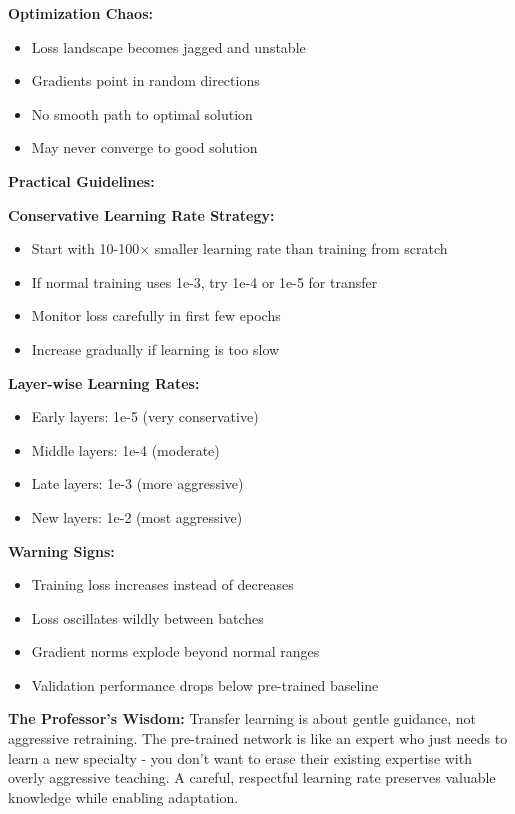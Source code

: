 \documentclass[12pt]{article}
\newcommand{\explanation}[1]{{\color{explanationcolor}#1}}
\begin{document}
\begin{enumerate}[(a)]
{{    \textbf{Optimization Chaos:}
    \begin{itemize}
        \item Loss landscape becomes jagged and unstable
        \item Gradients point in random directions
        \item No smooth path to optimal solution
        \item May never converge to good solution
    \end{itemize}
    }
    
    \textbf{Practical Guidelines:}
    
    \explanation{
    \textbf{Conservative Learning Rate Strategy:}
    \begin{itemize}
        \item Start with 10-100× smaller learning rate than training from scratch
        \item If normal training uses 1e-3, try 1e-4 or 1e-5 for transfer
        \item Monitor loss carefully in first few epochs
        \item Increase gradually if learning is too slow
    \end{itemize}
    
    \textbf{Layer-wise Learning Rates:}
    \begin{itemize}
        \item Early layers: 1e-5 (very conservative)
        \item Middle layers: 1e-4 (moderate)
        \item Late layers: 1e-3 (more aggressive)
        \item New layers: 1e-2 (most aggressive)
    \end{itemize}
    
    \textbf{Warning Signs:}
    \begin{itemize}
        \item Training loss increases instead of decreases
        \item Loss oscillates wildly between batches
        \item Gradient norms explode beyond normal ranges
        \item Validation performance drops below pre-trained baseline
    \end{itemize}
    }
    
    \textbf{The Professor's Wisdom:}
    \explanation{
    Transfer learning is about gentle guidance, not aggressive retraining. The pre-trained network is like an expert who just needs to learn a new specialty - you don't want to erase their existing expertise with overly aggressive teaching. A careful, respectful learning rate preserves valuable knowledge while enabling adaptation.
    }
    }
\end{enumerate}
\end{document}
